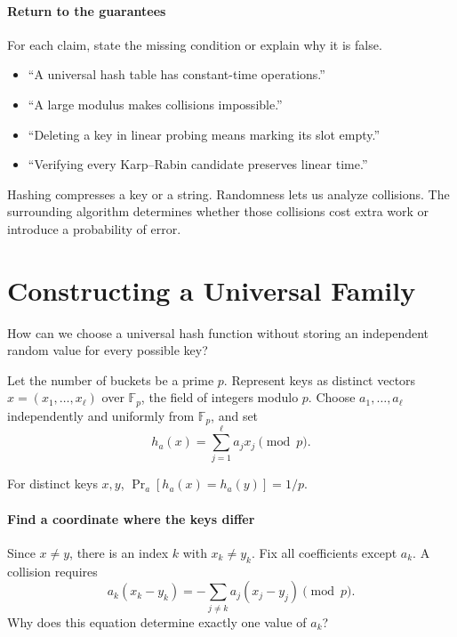 \documentclass[11pt]{article}
\begin{document}
\paragraph{Return to the guarantees}
For each claim, state the missing condition or explain why it is false.
\begin{itemize}
    \item ``A universal hash table has constant-time operations.''
    \vs{.6cm}
    \item ``A large modulus makes collisions impossible.''
    \vs{.6cm}
    \item ``Deleting a key in linear probing means marking its slot empty.''
    \vs{.6cm}
    \item ``Verifying every Karp--Rabin candidate preserves linear time.''
    \vs{.6cm}
\end{itemize}

\vfill
Hashing compresses a key or a string. Randomness lets us analyze collisions.
The surrounding algorithm determines whether those collisions cost extra
work or introduce a probability of error.

\newpage
\section*{Constructing a Universal Family}
How can we choose a universal hash function without storing an independent
random value for every possible key?

Let the number of buckets be a prime $p$. Represent keys as distinct vectors
$x=(x_1,\ldots,x_\ell)$ over $\mathbb F_p$, the field of integers modulo $p$.
Choose $a_1,\ldots,a_\ell$ independently and uniformly from $\mathbb F_p$, and set
\begin{equation*}
    h_a(x)=\sum_{j=1}^{\ell}a_jx_j\pmod p.
\end{equation*}

\begin{theorem}
    For distinct keys $x,y$, $\Pr_a[h_a(x)=h_a(y)]=1/p$.
\end{theorem}

\paragraph{Find a coordinate where the keys differ}
Since $x\neq y$, there is an index $k$ with $x_k\neq y_k$. Fix all coefficients
except $a_k$. A collision requires
\begin{equation*}
    a_k(x_k-y_k)=-\sum_{j\neq k}a_j(x_j-y_j)\pmod p.
\end{equation*}
Why does this equation determine exactly one value of $a_k$?
\vs{.8cm}
\end{document}
